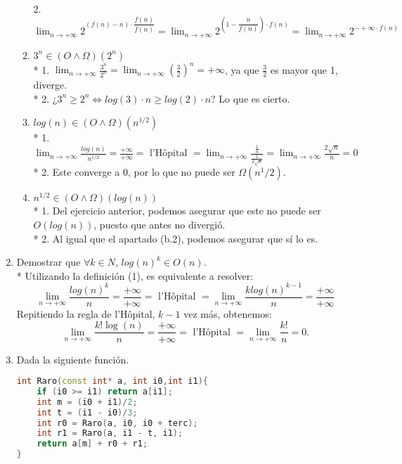 \documentclass{article}
\begin{document}
\begin{enumerate}
\begin{enumerate}
				2. $\displaystyle{\lim_{n \to +\infty}}2^{(f(n)-n)\cdot\dfrac{f(n)}{f(n)}}=\displaystyle{\lim_{n \to +\infty}}2^{(1-\dfrac{n}{f(n)})\cdot f(n)}=\displaystyle{\lim_{n \to +\infty}}2^{-+\infty\cdot f(n)}$
			\item $3^n\in (O\wedge\Omega)(2^n)$\\*
				1.  $\displaystyle{\lim_{n \to +\infty}} \frac{3^{n}}{2^n} = \displaystyle{\lim_{n \to +\infty}} \left(\frac{3}{2}\right)^{n}=+\infty$, ya que $\frac{3}{2}$ es mayor que 1, diverge.\\*
				2. ¿$3^n\ge 2^n \Leftrightarrow log(3)\cdot n \ge log(2)\cdot n$? Lo que es cierto.
			\item $log(n)\in (O\wedge\Omega)(n^{1/2})$\\*
				1. $\displaystyle{\lim_{n \to +\infty}} \frac{log(n)}{n^{1/2}} = \frac{+\infty}{+\infty} = \text{ l'Hôpital } = \displaystyle{\lim_{n \to +\infty}} \frac{\frac{1}{n}}{\frac{1}{2\sqrt{n}}}=\displaystyle{\lim_{n \to +\infty}}\frac{2\sqrt{n}}{n}=0$\\*
				2. Este converge a 0, por lo que no puede ser $\Omega(n^1/2)$.
			\item $n^{1/2}\in (O\wedge\Omega)(log(n))$\\*
				1. Del ejercicio anterior, podemos asegurar que este no puede ser $O(log(n))$, puesto que antes no divergió.\\*
				2. Al igual que el apartado (b.2), podemos asegurar que sí lo es.
		\end{enumerate}
\newpage
		\item Demostrar que $\forall k\in N$, $log(n)^k\in O(n)$.\\*
		Utilizando la definición (1), es equivalente a resolver:
		\[
			\displaystyle{\lim_{n \to +\infty}} \frac{log(n)^k}{n}=\dfrac{+\infty}{+\infty}=\text{ l'Hôpital }=\displaystyle{\lim_{n \to +\infty}} \frac{klog(n)^{k-1}}{n}=\dfrac{+\infty}{+\infty}
		\]
		Repitiendo la regla de l'Hôpital, $k-1$ vez más, obtenemos:
		\[
			\displaystyle{\lim_{n \to +\infty}} \frac{k!\log(n)}{n}=\dfrac{+\infty}{+\infty}=\text{ l'Hôpital }=\displaystyle{\lim_{n \to +\infty}} \frac{k!}{n}=0.
		\]
		\item Dada la siguiente función.
\begin{lstlisting}[language=c++]
int Raro(const int* a, int i0,int i1){
	if (i0 >= i1) return a[i1];
	int m = (i0 + i1)/2;
	int t = (i1 - i0)/3;
	int r0 = Raro(a, i0, i0 + terc);
	int r1 = Raro(a, i1 - t, i1);
	return a[m] + r0 + r1;
}
\end{lstlisting}
\begin{enumerate}

\end{enumerate}
\end{enumerate}
\end{document}

